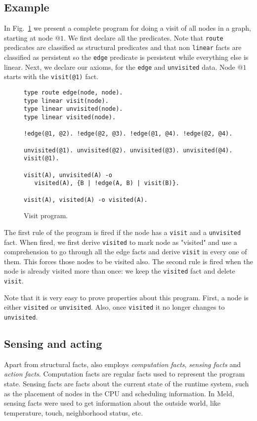 \subsection{Example}

In Fig.~\ref{code:visit} we present a complete \lang program for doing a visit of all nodes
in a graph, starting at node $@1$. We first declare all the predicates. Note that \texttt{route} predicates are classified as structural predicates and that non \texttt{linear} facts are classified as persistent so the \texttt{edge} predicate is persistent while everything else is linear. Next, we declare our axioms, for the \texttt{edge} and \texttt{unvisited} data. Node $@1$ starts with the \texttt{visit(@1)} fact.

\begin{figure}[h!]
\small\begin{verbatim}
type route edge(node, node).
type linear visit(node).
type linear unvisited(node).
type linear visited(node).

!edge(@1, @2). !edge(@2, @3). !edge(@1, @4). !edge(@2, @4).

unvisited(@1). unvisited(@2). unvisited(@3). unvisited(@4).
visit(@1).

visit(A), unvisited(A) -o
   visited(A), {B | !edge(A, B) | visit(B)}.

visit(A), visited(A) -o visited(A).
\end{verbatim}
  \caption{Visit program.}
  \label{code:visit}
\end{figure}
\normalsize

The first rule of the program is fired if the node has a \texttt{visit} and a \texttt{unvisited} fact. When fired, we first derive \texttt{visited} to mark node as "visited" and use a
comprehension to go through all the edge facts and derive \texttt{visit} in every one of them.
This forces those nodes to be visited also. The second rule is fired when the node is already
visited more than once: we keep the \texttt{visited} fact and delete \texttt{visit}.

Note that it is very easy to prove properties about this program. First, a node is either
\texttt{visited} or \texttt{unvisited}. Also, once \texttt{visited} it no longer changes to
\texttt{unvisited}.

\subsection{Sensing and acting}

Apart from structural facts, \lang also employs \emph{computation facts}, \emph{sensing facts}
and \emph{action facts}.
Computation facts are regular facts used to represent the program state.
Sensing facts are facts about the current state of the runtime system, such as the placement
of nodes in the CPU and scheduling information. In Meld, sensing facts
were used to get information about the outside world, like temperature, touch, neighborhood status,
etc.


